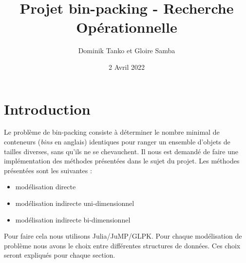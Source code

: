 \documentclass{article}
\title{Projet bin-packing - Recherche Opérationnelle}
\author{Dominik Tanko et Gloire Samba}
\date{2 Avril 2022}
\begin{document}
\maketitle

\newpage

\section{Introduction}
    Le problème de bin-packing consiste à déterminer le nombre minimal de conteneurs (\textit{bins} en anglais) identiques pour ranger un ensemble d’objets de tailles diverses, sans qu’ils ne se chevauchent.
    Il nous est demandé de faire une implémentation des méthodes présentées dans le sujet du projet. Les méthodes présentées sont les suivantes : 
    \begin{itemize}
        \item modélisation directe
        \item modélisation indirecte uni-dimensionnel
        \item modélisation indirecte bi-dimensionnel
    \end{itemize}
    Pour faire cela nous utilisons Julia/JuMP/GLPK. Pour chaque modélisation de problème nous avons le choix entre différentes structures de données. Ces choix seront expliqués pour chaque section.
\end{document}
